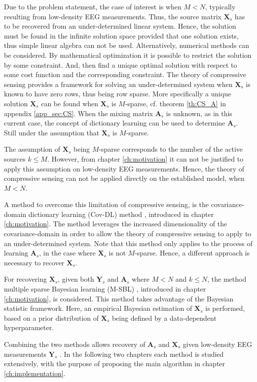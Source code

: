 Due to the problem statement, the case of interest is when $M < N$, typically resulting from low-density EEG measurements. 
Thus, the source matrix $\mathbf{X}_s$ has to be recovered from an under-determined linear system. 
Hence, the solution must be found in the infinite solution space provided that one solution exists, thus simple linear algebra can not be used. 
Alternatively, numerical methods can be considered. By mathematical optimization it is possible to restrict the solution by some constraint. And, then find a unique optimal solution with respect to some cost function and the corresponding constraint.
The theory of compressive sensing provides a framework for solving an under-determined system when $\mathbf{X}_s$ is known to have zero rows, thus being row sparse. 
More specifically a unique solution $\mathbf{X}_s$ can be found when $\mathbf{X}_s$ is $M$-sparse, cf. theorem \ref{th:CS_A} in appendix \ref{app_sec:CS}. 
When the mixing matrix $\mathbf{A}_s$ is unknown, as in this current case, the concept of dictionary learning can be used to determine $\mathbf{A}_s$. Still under the assumption that $\mathbf{X}_s$ is $M$-sparse.  

The assumption of $\mathbf{X}_s$ being $M$-sparse corresponds to the number of the active sources $k \leq M$. 
However, from chapter \ref{ch:motivation} it can not be justified to apply this assumption on low-density EEG measurements. 
Hence, the theory of compressive sensing can not be applied directly on the established model, when $M < N$. 

A method to overcome this limitation of compressive sensing, is the covariance-domain dictionary learning (Cov-DL) method \cite{Balkan2015}, introduced in chapter \ref{ch:motivation}.
The method leverages the increased dimensionality of the covariance-domain in order to allow the theory of compressive sensing to apply to an under-determined system. 
Note that this method only applies to the process of learning $\mathbf{A}_s$, in the case where $\mathbf{X}_s$ is not $M$-sparse. 
Hence, a different approach is necessary to recover $\mathbf{X}_s$.

For recovering $\mathbf{X}_s$, given both $\mathbf{Y}_s$ and $\mathbf{A}_s$ where $M < N$ and $k \leq N$, the method multiple sparse Bayesian learning (M-SBL) \cite{Balkan2014}, introduced in chapter \ref{ch:motivation}, is considered.
This method takes advantage of the Bayesian statistic framework. 
Here, an empirical Bayesian estimation of $\mathbf{X}_s$ is performed, based on a prior distribution of $\mathbf{X}_s$ being defined by a data-dependent hyperparameter.  

Combining the two methods allows recovery of $\mathbf{A}_s$ and $\mathbf{X}_s$ given low-density EEG measurements $\mathbf{Y}_s$ \cite{phd2015}. 
In the following two chapters each method is studied extensively, with the purpose of proposing the main algorithm in chapter \ref{ch:implementation}. 
